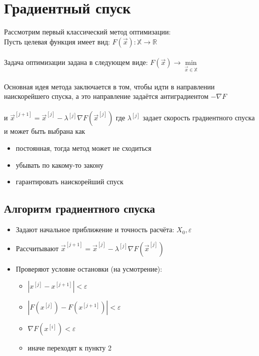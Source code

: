 \documentclass{article}
\begin{document}
    \section{Градиентный спуск}
    Рассмотрим первый классический метод оптимизации:\\
    Пусть целевая функция имеет вид:
    $F(\vec{x}): \mathbb{X} \rightarrow \mathbb{R}$\\\\
    Задача оптимизации задана в следующем виде:
    $F(\vec{x}) \rightarrow    \underset{\vec{x} \in \mathbb{X}}{\min}$\\\\
    Основная идея метода заключается в том, чтобы идти в направлении наискорейшего спуска, а это направление задаётся антиградиентом $-\nabla F$\\\\
    и $\vec{x}^{[j+1]}=\vec{x}^{[j]}-\lambda^{[j]} \nabla F\left(\vec{x}^{[j]}\right)$
    где $\lambda ^{[j]}$ задает скорость градиентного спуска и может быть выбрана как
    \begin{itemize}
        \item постоянная, тогда метод может не сходиться
        \item убывать по какому-то закону
        \item гарантировать наискорейший спуск
    \end{itemize}

    \subsection{Алгоритм градиентного спуска}
    \begin{itemize}
        \item Задают начальное приближение и точность расчёта: $X_0, \varepsilon$
        \item Рассчитывают $\vec{x}^{[j+1]}=\vec{x}^{[j]}-\lambda^{[j]} \nabla F\left(\vec{x}^{[j]}\right)$
        \item Проверяют условие остановки (на усмотрение):
        \begin{itemize}
            \item $|x^{[j]}-x^{[j+1]}|<\varepsilon$
            \item $|F(x^{[j]})-F(x^{[j+1]})|
            <\varepsilon$
            \item $\nabla F(x^{[i]})<\varepsilon$
            \item иначе переходят к пункту 2
        \end{itemize}
    \end{itemize}
\end{document}
